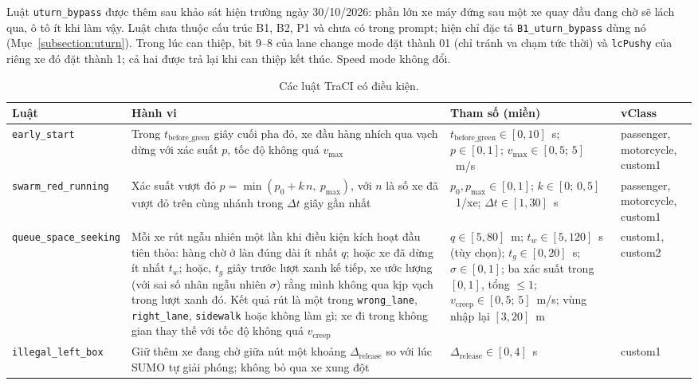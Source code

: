 \documentclass[../DoAn.tex]{subfiles}
\begin{document}
Luật \texttt{uturn\_bypass} được thêm sau khảo sát hiện trường ngày 30/10/2026: phần lớn xe máy đứng sau một xe quay đầu đang chờ sẽ lách qua, ô tô ít khi làm vậy. Luật chưa thuộc cấu trúc B1, B2, P1 và chưa có trong prompt; hiện chỉ đặc tả \texttt{B1\_uturn\_bypass} dùng nó (Mục~\ref{subsection:uturn}). Trong lúc can thiệp, bit 9--8 của lane change mode đặt thành 01 (chỉ tránh va chạm tức thời) và \texttt{lcPushy} của riêng xe đó đặt thành 1; cả hai được trả lại khi can thiệp kết thúc. Speed mode không đổi.

\begin{table}[ht]
\centering
\small
\caption{Các luật TraCI có điều kiện.}
\label{table:3.2}
\begin{tabular}{|p{2.6cm}|p{5.2cm}|p{3.3cm}|p{2.1cm}|}
\hline
\textbf{Luật} & \textbf{Hành vi} & \textbf{Tham số (miền)} & \textbf{vClass} \\ \hline
\texttt{early\_\allowbreak start} & Trong $t_{\text{before\_green}}$ giây cuối pha đỏ, xe đầu hàng nhích qua vạch dừng với xác suất $p$, tốc độ không quá $v_{\max}$ & $t_{\text{before\_green}} \in [0,10]$~s; $p \in [0,1]$; $v_{\max} \in [0{,}5;\,5]$~m/s & passenger, motorcycle, custom1 \\ \hline
\texttt{swarm\_\allowbreak red\_\allowbreak running} & Xác suất vượt đỏ $p = \min(p_0 + k\,n,\ p_{\max})$, với $n$ là số xe đã vượt đỏ trên cùng nhánh trong $\Delta t$ giây gần nhất & $p_0, p_{\max} \in [0,1]$; $k \in [0;\,0{,}5]$~1/xe; $\Delta t \in [1,30]$~s & passenger, motorcycle, custom1 \\ \hline
\texttt{queue\_\allowbreak space\_\allowbreak seeking} & Mỗi xe rút ngẫu nhiên một lần khi điều kiện kích hoạt đầu tiên thỏa: hàng chờ ở làn đúng dài ít nhất $q$; hoặc xe đã dừng ít nhất $t_w$; hoặc, $t_{g}$ giây trước lượt xanh kế tiếp, xe ước lượng (với sai số nhân ngẫu nhiên $\sigma$) rằng mình không qua kịp vạch trong lượt xanh đó. Kết quả rút là một trong \texttt{wrong\_lane}, \texttt{right\_lane}, \texttt{sidewalk} hoặc không làm gì; xe đi trong không gian thay thế với tốc độ không quá $v_{\text{creep}}$ & $q \in [5,80]$~m; $t_w \in [5,120]$~s (tùy chọn); $t_{g} \in [0,20]$~s; $\sigma \in [0,1]$; ba xác suất trong $[0,1]$, tổng $\le 1$; $v_{\text{creep}} \in [0{,}5;\,5]$~m/s; vùng nhập lại $[3,20]$~m & custom1, custom2 \\ \hline
\texttt{illegal\_\allowbreak left\_\allowbreak box} & Giữ thêm xe đang chờ giữa nút một khoảng $\Delta_{\text{release}}$ so với lúc SUMO tự giải phóng; không bỏ qua xe xung đột & $\Delta_{\text{release}} \in [0,4]$~s & custom1 \\ \hline

\end{tabular}
\end{table}
\end{document}
